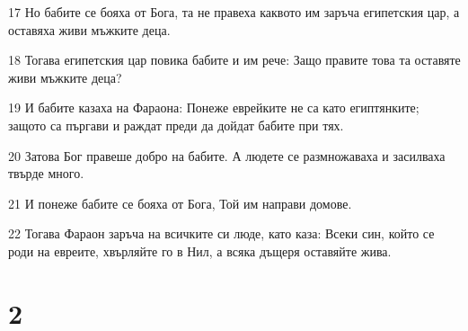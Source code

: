 \par 17 Но бабите се бояха от Бога, та не правеха каквото им заръча египетския цар, а оставяха живи мъжките деца.
\par 18 Тогава египетския цар повика бабите и им рече: Защо правите това та оставяте живи мъжките деца?
\par 19 И бабите казаха на Фараона: Понеже еврейките не са като египтянките; защото са пъргави и раждат преди да дойдат бабите при тях.
\par 20 Затова Бог правеше добро на бабите. А людете се размножаваха и засилваха твърде много.
\par 21 И понеже бабите се бояха от Бога, Той им направи домове.
\par 22 Тогава Фараон заръча на всичките си люде, като каза: Всеки син, който се роди на евреите, хвърляйте го в Нил, а всяка дъщеря оставяйте жива.

\chapter{2}

